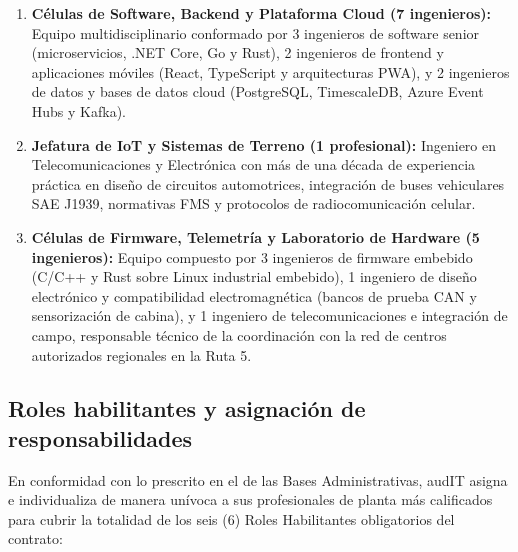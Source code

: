 \begin{enumerate}
  \item \textbf{Células de Software, Backend y Plataforma Cloud (7 ingenieros):} Equipo multidisciplinario conformado por 3 ingenieros de software senior (microservicios, .NET Core, Go y Rust), 2 ingenieros de frontend y aplicaciones móviles (React, TypeScript y arquitecturas PWA), y 2 ingenieros de datos y bases de datos cloud (PostgreSQL, TimescaleDB, Azure Event Hubs y Kafka).
  \item \textbf{Jefatura de IoT y Sistemas de Terreno (1 profesional):} Ingeniero en Telecomunicaciones y Electrónica con más de una década de experiencia práctica en diseño de circuitos automotrices, integración de buses vehiculares SAE J1939, normativas FMS y protocolos de radiocomunicación celular.
  \item \textbf{Células de Firmware, Telemetría y Laboratorio de Hardware (5 ingenieros):} Equipo compuesto por 3 ingenieros de firmware embebido (C/C++ y Rust sobre Linux industrial embebido), 1 ingeniero de diseño electrónico y compatibilidad electromagnética (bancos de prueba CAN y sensorización de cabina), y 1 ingeniero de telecomunicaciones e integración de campo, responsable técnico de la coordinación con la red de centros autorizados regionales en la Ruta 5.
\end{enumerate}

\subsection{Roles habilitantes y asignación de responsabilidades}\label{sec:1-roles-habilitantes}

En conformidad con lo prescrito en el  de las Bases Administrativas, audIT asigna e individualiza de manera unívoca a sus profesionales de planta más calificados para cubrir la totalidad de los seis (6) Roles Habilitantes obligatorios del contrato:

